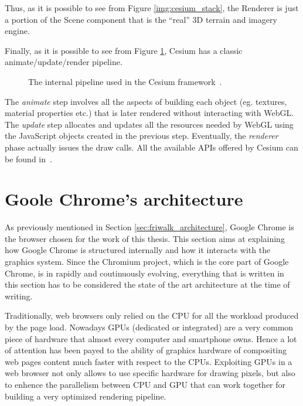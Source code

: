 Thus, as it is possible to see from Figure \ref{img:cesium_stack},
the Renderer is just a portion of the Scene component that is the ``real'' 3D
terrain and imagery engine.

Finally, as it is possible to see from Figure \ref{img:cesium_pipeline},
Cesium has a classic animate/update/render pipeline.
\begin{figure}[!htb]
    \caption{The internal pipeline used in the Cesium framework~\cite{fig_cesium_pipeline}.}
    \label{img:cesium_pipeline}
\end{figure}

The \emph{animate} step involves all the aspects of building each object (eg.
textures, material properties etc.) that is later rendered without interacting with
WebGL. The \emph{update} step allocates and updates all the resources needed by
WebGL using the JavaScript objects created in the previous step. Eventually, the
\emph{renderer} phase actually issues the draw calls. All the available APIs
offered by Cesium can be found in~\cite{cesiumapi}.


\section{Goole Chrome's architecture}
As previously mentioned in Section \ref{sec:friwalk_architecture}, Google Chrome
is the browser chosen for the work of this thesis. This section aims at explaining
how Google Chrome is structured internally and how it interacts with the graphics
system. Since the Chromium project, which is the core part of Google Chrome, is
in rapidly and coutinuously evolving, everything that is written in this section
has to be considered the state of the art architecture at the time of writing.

Traditionally, web browsers only relied on the CPU for all the workload produced
by the page load. Nowadays GPUs (dedicated or integrated) are a very common piece
of hardware that almost every computer and smartphone owns. Hence a lot of attention
has been payed to the ability of graphics hardware of compositing web pages content
much faster with respect to the CPUs. Exploiting GPUs in a web
browser not only allows to use specific hardware for drawing pixels, but also to
enhence the parallelism between CPU and GPU that can work together for building
a very optimized rendering pipeline.

